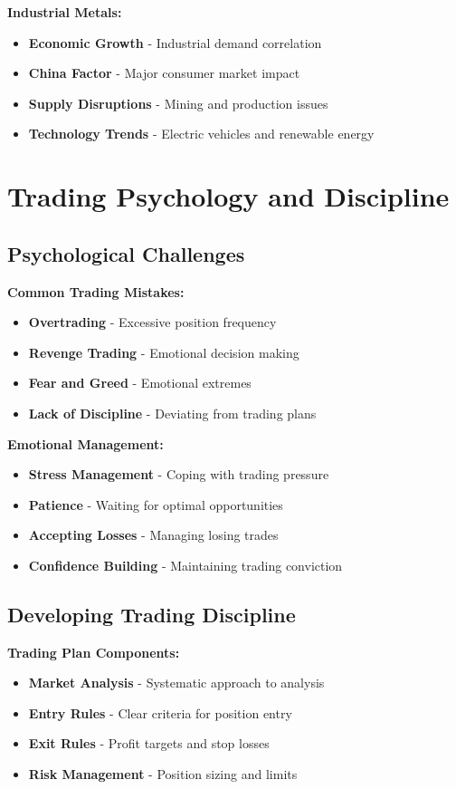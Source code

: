 \documentclass[12pt]{article}
\begin{document}
\textbf{Industrial Metals:}
\begin{itemize}
    \item \textbf{Economic Growth} - Industrial demand correlation
    \item \textbf{China Factor} - Major consumer market impact
    \item \textbf{Supply Disruptions} - Mining and production issues
    \item \textbf{Technology Trends} - Electric vehicles and renewable energy
\end{itemize}

\section{Trading Psychology and Discipline}

\subsection{Psychological Challenges}

\textbf{Common Trading Mistakes:}
\begin{itemize}
    \item \textbf{Overtrading} - Excessive position frequency
    \item \textbf{Revenge Trading} - Emotional decision making
    \item \textbf{Fear and Greed} - Emotional extremes
    \item \textbf{Lack of Discipline} - Deviating from trading plans
\end{itemize}

\textbf{Emotional Management:}
\begin{itemize}
    \item \textbf{Stress Management} - Coping with trading pressure
    \item \textbf{Patience} - Waiting for optimal opportunities
    \item \textbf{Accepting Losses} - Managing losing trades
    \item \textbf{Confidence Building} - Maintaining trading conviction
\end{itemize}

\subsection{Developing Trading Discipline}

\textbf{Trading Plan Components:}
\begin{itemize}
    \item \textbf{Market Analysis} - Systematic approach to analysis
    \item \textbf{Entry Rules} - Clear criteria for position entry
    \item \textbf{Exit Rules} - Profit targets and stop losses
    \item \textbf{Risk Management} - Position sizing and limits
\end{itemize}
\end{document}
